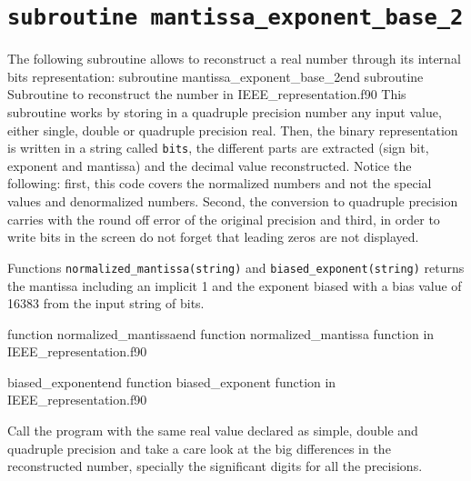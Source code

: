 \section{\texttt{subroutine mantissa\_exponent\_base\_2}} 
The following subroutine allows to reconstruct a real number through its internal bits representation: 
{subroutine mantissa_exponent_base_2}{end subroutine}
{Subroutine to reconstruct the number in IEEE_representation.f90} 
This subroutine works by storing in a quadruple precision number any input value, 
either single, double or quadruple precision real. Then,  
the binary representation is written in a string called \texttt{bits}, 
the different parts are extracted (sign bit, exponent and mantissa) 
and the decimal value reconstructed. 
Notice the following: 
first, this code covers the normalized numbers and not the special values and denormalized numbers. 
Second, the conversion to quadruple precision carries with the round off error of the original precision and 
third, in order to write bits in the screen do not forget that leading zeros are not displayed.

Functions \texttt{normalized\_mantissa(string)} and \texttt{biased\_exponent(string)} returns the mantissa including an implicit 1 and the exponent biased with a bias value of 16383 from the input string of bits. 

{function normalized_mantissa}{end function}
{normalized_mantissa function in IEEE_representation.f90} 

{biased_exponent}{end function}
{biased_exponent function in IEEE_representation.f90} 

Call the program with the same real value declared as simple, double and quadruple precision and take a care look at the big differences in the reconstructed number, specially the significant digits for all the precisions. 







 






































